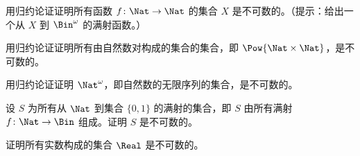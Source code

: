 \documentclass[../../../include/open-logic-section]{subfiles}
\begin{document}

\begin{prob}\label{sfr:siz:red:prob:nat-nat}
  用归约论证证明所有函数 $f\colon \Nat \to \Nat$ 的集合 $X$ 是不可数的。（提示：给出一个从 $X$ 到 $\Bin^\omega$ 的满射函数。）
\end{prob}

\begin{prob}
用归约论证证明所有由自然数对构成的集合的集合，即 $\Pow{\Nat \times \Nat}$，是不可数的。
\end{prob}

\begin{prob}
用归约论证证明 $\Nat^\omega$，即自然数的无限序列的集合，是不可数的。
\end{prob}


\begin{prob}
设 $S$ 为所有从 $\Nat$ 到集合 $\{0,1\}$ 的满射的集合，即 $S$ 由所有满射 $f \colon \Nat \to \Bin$ 组成。证明 $S$ 是不可数的。
\end{prob}

\begin{prob}
证明所有实数构成的集合 $\Real$ 是不可数的。
\end{prob}
\end{document}
